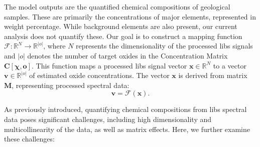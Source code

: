 The model outputs are the quantified chemical compositions of geological samples. 
These are primarily the concentrations of major elements, represented in weight percentage. 
While background elements are also present, our current analysis does not quantify these. 
Our goal is to construct a mapping function $\mathcal{F}: \mathbb{R}^N \rightarrow \mathbb{R}^{|o|}$, where $N$ represents the dimensionality of the processed \gls{libs} signals and $|o|$ denotes the number of target oxides in the Concentration Matrix $\mathbf{C[\chi, o]}$.
This function maps a processed \gls{libs} signal vector $\mathbf{x} \in \mathbb{R}^N$ to a vector $\mathbf{v} \in \mathbb{R}^{|o|}$ of estimated oxide concentrations. The vector $\mathbf{x}$ is derived from matrix $\mathbf{M}$, representing processed spectral data:
\[
\mathbf{v} = \mathcal{F}(\mathbf{x}).
\]

As previously introduced, quantifying chemical compositions from \gls{libs} spectral data poses significant challenges, including high dimensionality and multicollinearity of the data, as well as matrix effects. Here, we further examine these challenges:

